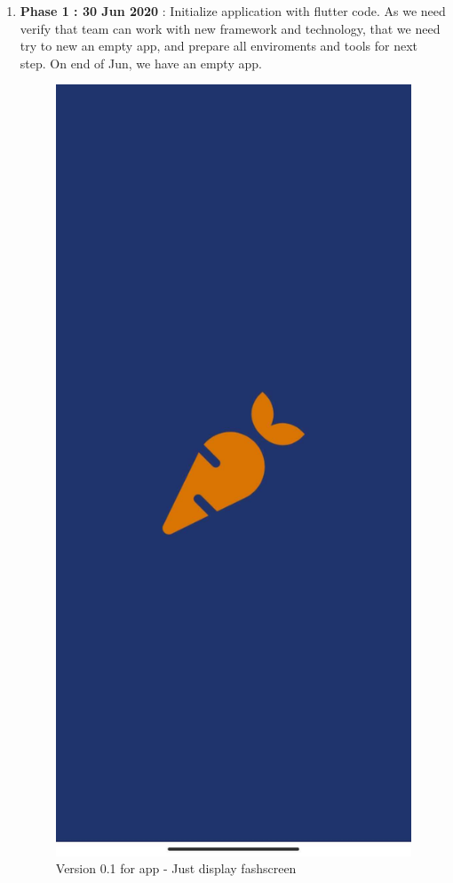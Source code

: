 \documentclass{article}
\begin{document}
    \begin{enumerate}
        \item \textbf{Phase 1 : 30 Jun 2020} : Initialize application with flutter code. As we need verify that team can work with new framework and technology, that we need try to new an empty app, and prepare all enviroments and tools for next step. On end of Jun, we have an empty app. \\
        \begin{figure}[h!]
            \centering
            \includegraphics[scale=0.1]{Images/flashcreen.jpg}
            \caption{Version 0.1 for app - Just display fashscreen}
            \label{fig:cookingbook}
            \end{figure}
        

\end{enumerate}
\end{document}
